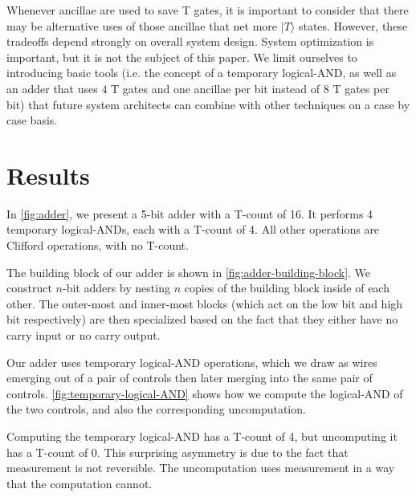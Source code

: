 \documentclass[twocolumn]{quantumarticle-customized}
\begin{document}
Whenever ancillae are used to save T gates, it is important to consider that there may be alternative uses of those ancillae that net more $|T\rangle$ states.
However, these tradeoffs depend strongly on overall system design.
System optimization is important, but it is not the subject of this paper.
We limit ourselves to introducing basic tools (i.e. the concept of a temporary logical-AND, as well as an adder that uses $4$ T gates and one ancillae per bit instead of $8$ T gates per bit) that future system architects can combine with other techniques on a case by case basis.


\section*{Results}

In \autoref{fig:adder}, we present a 5-bit adder with a T-count of 16.
It performs 4 temporary logical-ANDs, each with a T-count of 4.
All other operations are Clifford operations, with no T-count.

The building block of our adder is shown in \autoref{fig:adder-building-block}.
We construct $n$-bit adders by nesting $n$ copies of the building block inside of each other.
The outer-most and inner-most blocks (which act on the low bit and high bit respectively) are then specialized based on the fact that they either have no carry input or no carry output.

Our adder uses temporary logical-AND operations, which we draw as wires emerging out of a pair of controls then later merging into the same pair of controls.
\autoref{fig:temporary-logical-AND} shows how we compute the logical-AND of the two controls, and also the corresponding uncomputation.

Computing the temporary logical-AND has a T-count of 4, but uncomputing it has a T-count of 0.
This surprising asymmetry is due to the fact that measurement is not reversible.
The uncomputation uses measurement in a way that the computation cannot.
\end{document}
